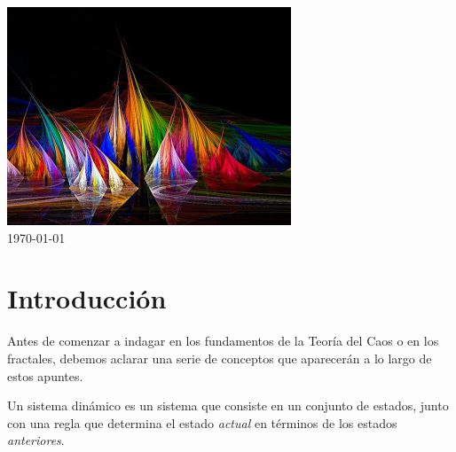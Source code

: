 \begin{titlepage}

\includegraphics{img/Logo.jpg}\\ %


{\large \today}\\[1cm] %



\vfill %

\end{titlepage}

\tableofcontents
\newpage

\section{Introducción}
Antes de comenzar a indagar en los fundamentos de la Teoría del Caos o en los fractales, debemos aclarar una serie de conceptos que aparecerán a lo largo de estos apuntes.

\begin{definition}\label{def:sistemaDinamico}
Un sistema dinámico es un sistema que consiste en un conjunto de estados, junto con una regla que determina el estado \emph{actual} en términos de los estados \emph{anteriores}.
\end{definition}

